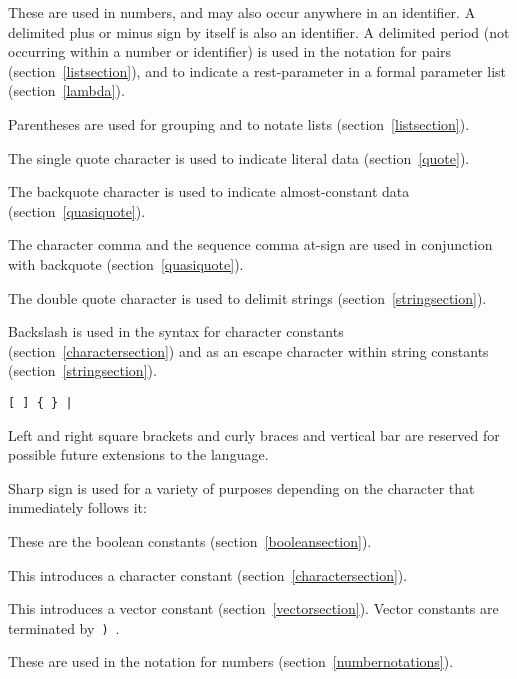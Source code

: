 \begin{description}{}{}

\item[{\tt.\ + -}]
These are used in numbers, and may also occur anywhere in an identifier.
A delimited plus or minus sign by itself
is also an identifier.
A delimited period (not occurring within a number or identifier) is used
in the notation for pairs (section~\ref{listsection}), and to indicate a
rest-parameter in a  formal parameter list (section~\ref{lambda}).

\item[\tt( )]
Parentheses are used for grouping and to notate lists
(section~\ref{listsection}).

\item[\singlequote]
The single quote character is used to indicate literal data (section~\ref{quote}).

\item[\backquote]
The backquote character is used to indicate almost-constant
data (section~\ref{quasiquote}).

\item[\tt, ,@]
The character comma and the sequence comma at-sign are used in conjunction
with backquote (section~\ref{quasiquote}).

\item[\tt"]
The double quote character is used to delimit strings (section~\ref{stringsection}).

\item[\backwhack]
Backslash is used in the syntax for character constants
(section~\ref{charactersection}) and as an escape character within string
constants (section~\ref{stringsection}).

\hbox{\tt \verb"[" \verb"]" \verb"{" \verb"}" \verb"|"}
\item[\copy0]
Left and right square brackets and curly braces and vertical bar
are reserved for possible future extensions to the language.

\item[\sharpsign] Sharp sign is used for a variety of purposes depending on
the character that immediately follows it:

\item[\schtrue{} \schfalse{}]
These are the boolean constants (section~\ref{booleansection}).

\item[\sharpsign\backwhack]
This introduces a character constant (section~\ref{charactersection}).

\item[\sharpsign\tt(]
This introduces a vector constant (section~\ref{vectorsection}).  Vector constants
are terminated by~{\tt)}~.

\item[{\tt\#e \#i \#b \#o \#d \#x}]
These are used in the notation for numbers (section~\ref{numbernotations}).

\end{description}
